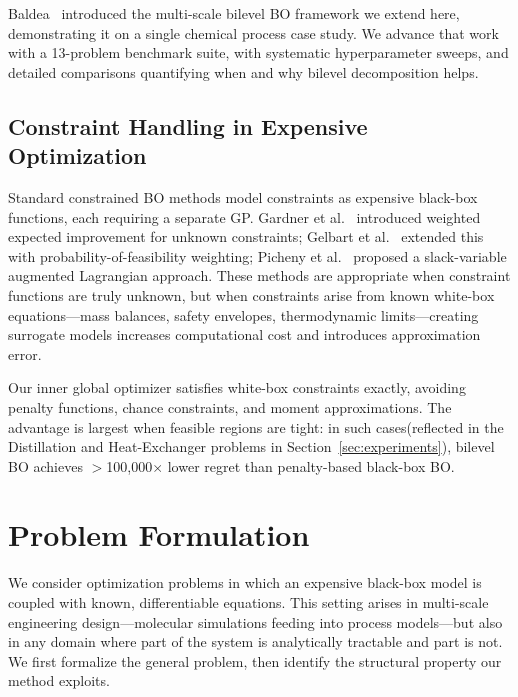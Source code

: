 \documentclass[12pt,a4paper]{article}%
\theoremstyle{plain}%
\theoremstyle{remark}%
\theoremstyle{definition}%
\begin{document}
Baldea~\cite{baldea2026multiscale} introduced the multi-scale bilevel BO framework we extend here, demonstrating it on a single chemical process case study. We advance that work with a 13-problem benchmark suite, with systematic hyperparameter sweeps, and detailed comparisons quantifying when and why bilevel decomposition helps.

\subsection{Constraint Handling in Expensive Optimization}

Standard constrained BO methods model constraints as expensive black-box functions, each requiring a separate GP. Gardner et al.~\cite{gardner2014} introduced weighted expected improvement for unknown constraints; Gelbart et al.~\cite{gelbart2014unknown} extended this with probability-of-feasibility weighting; Picheny et al.~\cite{picheny2016albo} proposed a slack-variable augmented Lagrangian approach. These methods are appropriate when constraint functions are truly unknown, but when constraints arise from known white-box equations---mass balances, safety envelopes, thermodynamic limits---creating surrogate models increases computational cost and introduces approximation error.

Our inner global optimizer satisfies white-box constraints exactly, avoiding penalty functions, chance constraints, and moment approximations. The advantage is largest when feasible regions are tight: in such cases(reflected in the Distillation and Heat-Exchanger problems in Section~\ref{sec:experiments}), bilevel BO achieves $>$100{,}000$\times$ lower regret than penalty-based black-box BO.

\section{Problem Formulation}\label{sec:problem_formulation}

We consider optimization problems in which an expensive black-box model is coupled with known, differentiable equations. This setting arises in multi-scale engineering design---molecular simulations feeding into process models---but also in any domain where part of the system is analytically tractable and part is not. We first formalize the general problem, then identify the structural property our method exploits.
\end{document}
